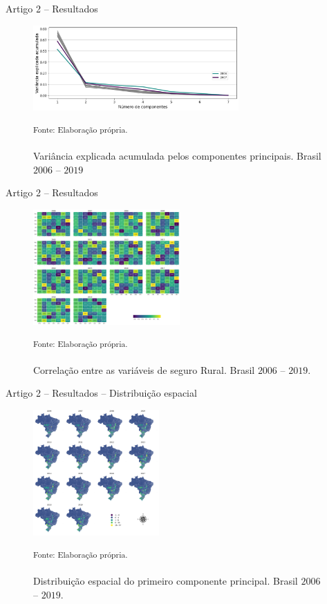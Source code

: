 \documentclass[aspectratio=169]{beamer}
\begin{document}
\begin{frame}{Artigo 2 -- Resultados}
	\begin{figure}
		\centering
		\includegraphics[width=0.7\textwidth]{img/var_radio.png}
		\caption{Variância explicada acumulada pelos componentes principais. Brasil $2006$ -- $2019$}
		\small \textsuperscript {Fonte: Elaboração própria.}
	\end{figure}
\end{frame}

\begin{frame}{Artigo 2 -- Resultados}
	\begin{figure}
		\centering
	    \includegraphics[width=0.5\textwidth]{img/corr_pca_var.png}
	    \caption{Correlação entre as variáveis de seguro Rural. Brasil $2006$ -- $2019$.}
		\small \textsuperscript {Fonte: Elaboração própria.}
	\end{figure}
\end{frame}

\begin{frame}{Artigo 2 -- Resultados  -- Distribuição espacial}
	\begin{figure}
		\centering
		\includegraphics[width=0.43\textwidth]{img/map_CP1_color.png}
		\caption{Distribuição espacial do primeiro componente principal. Brasil $2006$ -- $2019$.}
		\small \textsuperscript {Fonte: Elaboração própria.}
	\end{figure}
\end{frame}
\end{document}

